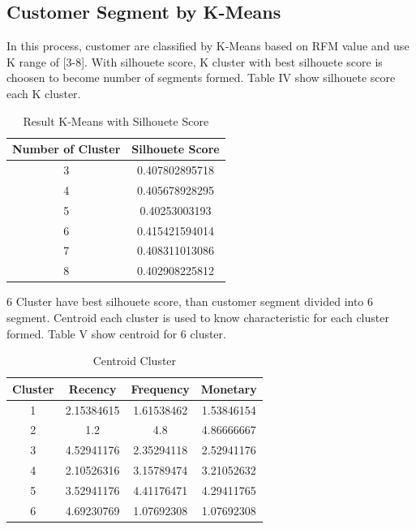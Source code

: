 \documentclass[conference]{IEEEtran}
\begin{document}
\subsection{Customer Segment by K-Means}
In this process, customer are classified by K-Means based on RFM value and use K range of [3-8]. With silhouete score, K cluster with best silhouete score is choosen to become number of segments formed. Table IV show silhouete score each K cluster.

\begin{table}[h]
\renewcommand{\arraystretch}{1.3}
\caption{Result K-Means with Silhouete Score}
\label{tab:result_k-means}
\centering
\begin{tabular}{c|c}
    \hline
    Number of Cluster & Silhouete Score\\
    \hline
    3 & 0.407802895718\\
    \hline
    4 & 0.405678928295\\
    \hline
    5 & 0.40253003193\\
    \hline
    6 & 0.415421594014\\
    \hline
    7 & 0.408311013086\\
    \hline
    8 & 0.402908225812\\
    \hline
\end{tabular}
\end{table}

6 Cluster have best silhouete score, than customer segment divided into 6 segment. Centroid each cluster is used to know characteristic for each cluster formed. Table V show centroid for 6 cluster. 

\begin{table}[h]
\renewcommand{\arraystretch}{1.3}
\caption{Centroid Cluster}
\label{tab:centroid_cluster}
\centering
\begin{tabular}{c|c|c|c}
    \hline
    Cluster & Recency & Frequency & Monetary\\
    \hline
    1 & 2.15384615 & 1.61538462 & 1.53846154\\
    \hline
    2 & 1.2 & 4.8 & 4.86666667\\
    \hline
    3 & 4.52941176 & 2.35294118 & 2.52941176\\
    \hline
    4 & 2.10526316 & 3.15789474 & 3.21052632\\
    \hline
    5 & 3.52941176 & 4.41176471 & 4.29411765\\
    \hline
    6 & 4.69230769 & 1.07692308 & 1.07692308\\
    \hline
\end{tabular}
\end{table}
\end{document}
